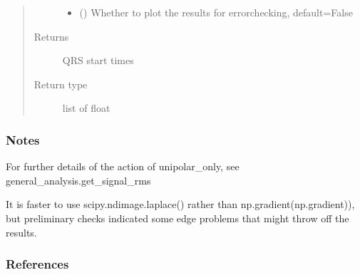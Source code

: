 \documentclass[letterpaper,10pt,english]{sphinxmanual}
\begin{document}
\begin{fulllineitems}
\begin{fulllineitems}
\begin{quote}
\begin{description}
\begin{itemize}
\item {} 
\sphinxAtStartPar
{} (\sphinxstyleliteralemphasis{\sphinxupquote{, }}) \textendash{} Whether to plot the results for error\sphinxhyphen{}checking, default=False

\end{itemize}

\item[{Returns}] \leavevmode
\sphinxAtStartPar
{} \textendash{} QRS start times

\item[{Return type}] \leavevmode
\sphinxAtStartPar
list of float

\end{description}\end{quote}
\subsubsection*{Notes}

\sphinxAtStartPar
For further details of the action of unipolar\_only, see general\_analysis.get\_signal\_rms

\sphinxAtStartPar
It is faster to use scipy.ndimage.laplace() rather than np.gradient(np.gradient)), but preliminary checks
indicated some edge problems that might throw off the results.
\subsubsection*{References}

\end{fulllineitems}



\end{fulllineitems}
\end{document}
